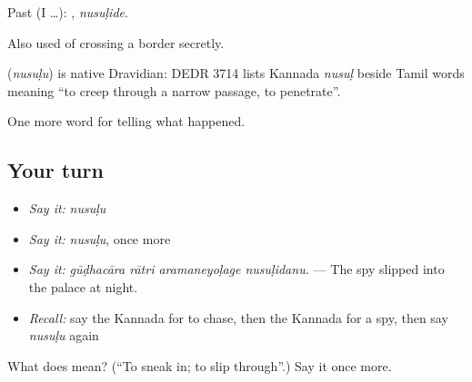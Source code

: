 Past (I …): , \emph{nusuḷide}.

Also used of crossing a border secretly.

\begin{cousinweb}
\textbf{} (\emph{nusuḷu}) is native Dravidian: DEDR 3714 lists Kannada \emph{nusuḷ} beside Tamil words meaning \textquotedblleft{}to creep through a narrow passage, to penetrate\textquotedblright{}.
\end{cousinweb}

\begin{grammarlens}[title={What you've built}]
One more word for telling what happened.
\end{grammarlens}

\subsection*{Your turn}
\begin{itemize}
\raggedright
  \item \emph{Say it:} \emph{nusuḷu}
  \item \emph{Say it:} \emph{nusuḷu}, once more
  \item \emph{Say it:} \emph{gūḍhacāra rātri aramaneyoḷage nusuḷidanu.} — The spy slipped into the palace at night.
  \item \emph{Recall:} say the Kannada for to chase, then the Kannada for a spy, then say \emph{nusuḷu} again
\end{itemize}

\begin{tcolorbox}[breakable,colback=teal!4,colframe=teal!35!black,title={Before you move on}]
What does  mean? (\textquotedblleft{}To sneak in; to slip through\textquotedblright{}.) Say it once more.
\end{tcolorbox}
